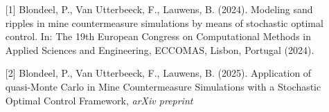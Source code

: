 \begin{talk}
\medskip
\begin{enumerate}
	\item[{[1]}] Blondeel, P., Van Utterbeeck, F., Lauwens, B. (2024). Modeling sand ripples in mine countermeasure simulations by means of stochastic optimal control. In: The 19th European Congress on Computational Methods in Applied Sciences and Engineering, ECCOMAS, Lisbon, Portugal (2024).
	\item[{[2]}] Blondeel, P., Van Utterbeeck, F., Lauwens, B. (2025).  Application of quasi-Monte Carlo in Mine Countermeasure Simulations with a Stochastic Optimal Control Framework, \textit{arXiv preprint}
\end{enumerate}

\end{talk}

